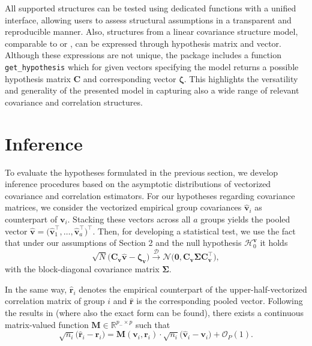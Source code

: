 All supported structures can be tested using dedicated functions with a unified
interface, allowing users to assess structural assumptions in a transparent and
reproducible manner. Also, structures from a linear covariance structure model,
comparable to \citet{anderson1973} or \citet{szatrowski1980}, can be
expressed through hypothesis matrix and vector. Although these expressions are
not unique, the package includes a function \texttt{get\_hypothesis} which for
given vectors specifying the model returns a possible hypothesis matrix \(\boldsymbol{C}\)
and corresponding vector \(\boldsymbol{\zeta}\).
This highlights the versatility and generality of the presented model in capturing also a wide range of relevant
covariance and correlation structures.

\section{Inference}\label{inference}

To evaluate the hypotheses formulated in the previous section, we develop
inference procedures based on the asymptotic distributions of vectorized
covariance and correlation estimators. For our hypotheses regarding covariance
matrices, we consider the vectorized empirical group covariances
\(\widehat{\boldsymbol{v}}_i\) as counterpart of \(\boldsymbol{v}_i\). Stacking
these vectors across all \(a\) groups yields the pooled vector
\(\widehat{\boldsymbol{v}}=\bigl(
\widehat{\boldsymbol{v}}_1^\top, \dots,
\widehat{\boldsymbol{v}}_a^\top
\bigr)^\top.\) Then, for developing a statistical test, we use the fact that under our
assumptions of Section 2 and the null hypothesis
\(\mathcal{H}_0^{\boldsymbol{v}}\) it holds
\begin{equation}
\sqrt{N}
\bigl(
\boldsymbol{C}_{\boldsymbol{v}} \widehat{\boldsymbol{v}}
- \boldsymbol{\zeta}_{\boldsymbol{v}}
\bigr)
\stackrel{\mathcal D}{\longrightarrow}
\mathcal{N}
\bigl(
\mathbf{0},
\boldsymbol{C}_{\boldsymbol{v}} \boldsymbol{\Sigma} \boldsymbol{C}_{\boldsymbol{v}}^\top
\bigr),
\label{eq:cov-limit}
\end{equation}
with the block-diagonal covariance matrix \(\boldsymbol{\Sigma}\).

In the same way, \(\widehat{\boldsymbol{r}}_i\) denotes the empirical counterpart
of the upper-half-vectorized correlation matrix of group \(i\) and
\(\widehat{\boldsymbol{r}}\) is the corresponding pooled vector. Following the
results in \citet{sattler2023} (where also the exact form can be found), there
exists a continuous matrix-valued function
\(\boldsymbol{M} \in \mathbb{R}^{p_- \times p}\) such that
\begin{equation}
\sqrt{n_i}
\bigl(
\widehat{\boldsymbol{r}}_i - \boldsymbol{r}_i
\bigr)
=
\boldsymbol{M}(\boldsymbol{v}_i, \boldsymbol{r}_i)
\cdot
\sqrt{n_i}
\bigl(
\widehat{\boldsymbol{v}}_i - \boldsymbol{v}_i
\bigr)
+ {\scriptstyle \mathcal{O}_P(1)}.
\label{eq:relation}
\end{equation}

